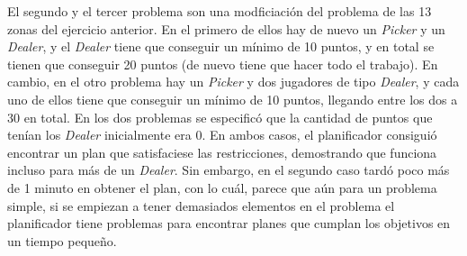 \documentclass[11pt,a4paper]{article}
\begin{document}
El segundo y el tercer problema son una modficiación del problema de las 13 zonas del ejercicio anterior. En el primero de ellos
hay de nuevo un \textit{Picker} y un \textit{Dealer}, y el \textit{Dealer} tiene que conseguir un mínimo de 10 puntos, y en total
se tienen que conseguir 20 puntos (de nuevo tiene que hacer todo el trabajo). En cambio, en el otro problema hay un \textit{Picker}
y dos jugadores de tipo \textit{Dealer}, y cada uno de ellos tiene que conseguir un mínimo de 10 puntos, llegando entre los dos a 30
en total. En los dos problemas se especificó que la cantidad de puntos que tenían los \textit{Dealer} inicialmente era 0.
En ambos casos, el planificador consiguió encontrar un plan que satisfaciese las restricciones, demostrando que funciona
incluso para más de un \textit{Dealer}. Sin embargo, en el segundo caso tardó poco más de 1 minuto en obtener el plan, con lo cuál,
parece que aún para un problema simple, si se empiezan a tener demasiados elementos en el problema el planificador tiene problemas
para encontrar planes que cumplan los objetivos en un tiempo pequeño.
\end{document}
